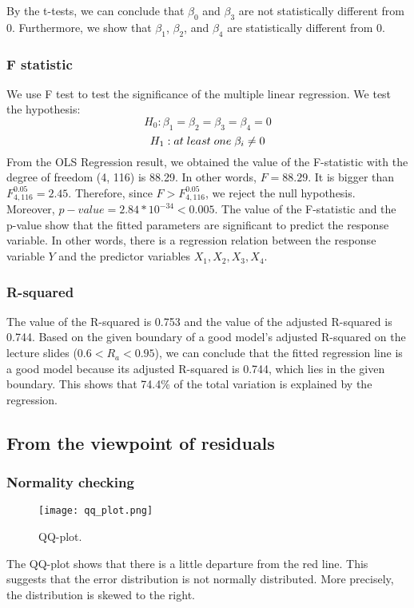 \documentclass[english]{article}
\begin{document}
By the t-tests, we can conclude that $\beta_0$ and $\beta_3$ are not statistically different from 0. Furthermore, we show that $\beta_1$, $\beta_2$, and $\beta_4$ are statistically different from 0. 

\subsubsection{F statistic}
We use F test to test the significance of the multiple linear regression. We test the hypothesis: 
$$ H_0: \beta_1 = \beta_2 = \beta_3 = \beta_4 = 0$$
$$ H_1: at \thickspace least \thickspace one \thickspace \beta_i \neq 0$$
From the OLS Regression result, we obtained the value of the F-statistic with the degree of freedom (4, 116) is 88.29. In other words, $F = 88.29$. It is bigger than $F_{4,116}^{0.05} = 2.45$. Therefore, since $F > F_{4,116}^{0.05}$, we reject the null hypothesis. \\

Moreover, $p-value = 2.84 * 10^{-34} < 0.005$. The value of the F-statistic and the p-value show that the fitted parameters are significant to predict the response variable. In other words, there is a regression relation between the response variable $Y$ and the predictor variables $X_1, X_2, X_3, X_4$. 

\subsubsection{R-squared}
The value of the R-squared is 0.753 and the value of the adjusted R-squared is 0.744. Based on the given boundary of a good model's adjusted R-squared on the lecture slides ($0.6 < R_a < 0.95$), we can conclude that the fitted regression line is a good model because its adjusted R-squared is 0.744, which lies in the given boundary. This shows that 74.4\% of the total variation is explained by the regression. 

\subsection{From the viewpoint of residuals}
\subsubsection{Normality checking}
\begin{figure}[H]
	\begin{centering}
  		\texttt{[image: qq\_plot.png]}
  		\caption{QQ-plot.\label{figure4}
}
	\end{centering}
\end{figure}
The QQ-plot shows that there is a little departure from the red line. This suggests that the error distribution is not normally distributed. More precisely, the distribution is skewed to the right.  
\end{document}
